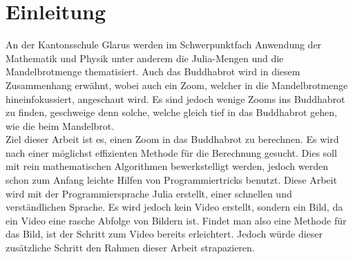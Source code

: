 \section{Einleitung}
An der Kantonsschule Glarus werden im Schwerpunktfach Anwendung der Mathematik und Physik unter anderem die Julia-Mengen und die Mandelbrotmenge thematisiert. Auch das Buddhabrot wird in diesem Zusammenhang erwähnt, wobei auch ein Zoom, welcher in die Mandelbrotmenge hineinfokussiert, angeschaut wird. Es sind jedoch wenige Zooms ins Buddhabrot zu finden, geschweige denn solche, welche gleich tief in das Buddhabrot gehen, wie die beim Mandelbrot.\\ 
Ziel dieser Arbeit ist es, einen Zoom in das Buddhabrot zu berechnen. Es wird nach einer möglichst effizienten Methode für die Berechnung gesucht. Dies soll mit rein mathematischen Algorithmen bewerkstelligt werden, jedoch werden schon zum Anfang leichte Hilfen von Programmiertricks benutzt. Diese Arbeit wird mit der Programmiersprache Julia erstellt, einer schnellen und verständlichen Sprache. Es wird jedoch kein Video erstellt, sondern ein Bild, da ein Video eine rasche Abfolge von Bildern ist. Findet man also eine Methode für das Bild, ist der Schritt zum Video bereits erleichtert. Jedoch würde dieser zusätzliche Schritt den Rahmen dieser Arbeit strapazieren.